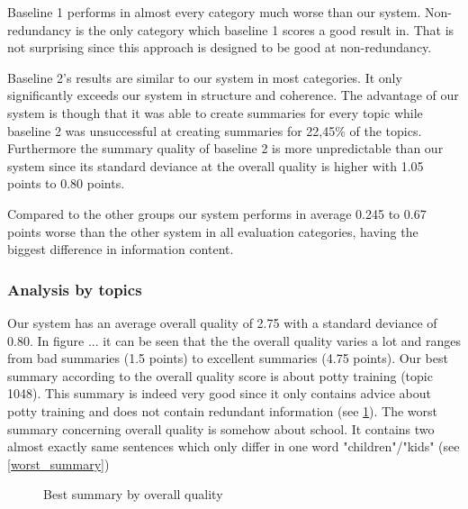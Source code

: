 Baseline 1 performs in almost every category much worse than our system. Non-redundancy is the only category which baseline 1 scores a good result in. That is not surprising since this approach is designed to be good at non-redundancy.

Baseline 2's results are similar to our system in most categories. It only significantly exceeds our system in structure and coherence. The advantage of our system is though that it was able to create summaries for every topic while baseline 2 was unsuccessful at creating summaries for 22,45\% of the topics. Furthermore the summary quality of baseline 2 is more unpredictable than our system since its standard deviance at the overall quality is higher with 1.05 points to 0.80 points.

Compared to the other groups our system performs in average 0.245 to 0.67 points worse than the other system in all evaluation  categories, having the biggest difference in information content.  


\subsubsection{Analysis by topics}

Our system has an average overall quality of 2.75 with a standard deviance of 0.80. In figure ... it can be seen that the the overall quality varies a lot and ranges from bad summaries (1.5 points) to excellent summaries (4.75 points). Our best summary according to the overall quality score is about potty training (topic 1048). This summary is indeed very good since it only contains advice about potty training and does not contain redundant information (see \ref{best_summary}). The worst summary concerning overall quality is somehow about school. It contains two almost exactly same sentences which only differ in one word "children"/"kids" (see \ref{worst_summary})

\begin{figure}
	\caption{Best summary by overall quality}
	\label{best_summary}
	\noindent{}	
\end{figure}

